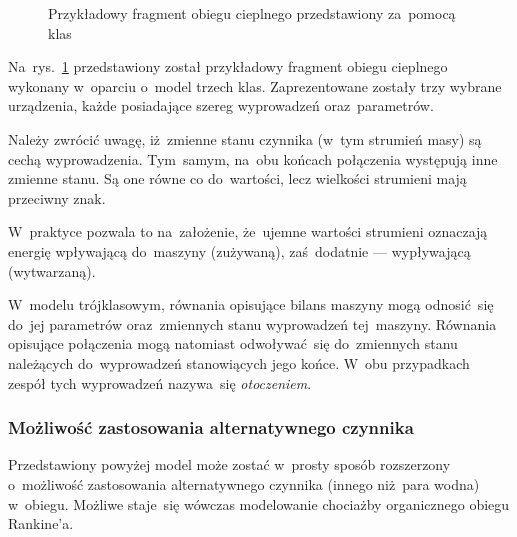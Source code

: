 \begin{figure}[h]

	\caption{Przykładowy fragment obiegu cieplnego przedstawiony
		za~pomocą klas}
	\label{klasy-przykl}
\end{figure}

Na~rys.~\ref{klasy-przykl} przedstawiony został przykładowy fragment
obiegu cieplnego wykonany w~oparciu o~model trzech klas. Zaprezentowane
zostały trzy wybrane urządzenia, każde posiadające szereg wyprowadzeń
oraz~parametrów.

Należy zwrócić uwagę, iż~zmienne stanu czynnika (w~tym strumień masy) są
cechą wyprowadzenia. Tym~samym, na~obu końcach połączenia występują inne
zmienne stanu. Są one równe co do~wartości, lecz wielkości strumieni
mają przeciwny znak.

W~praktyce pozwala to na~założenie, że~ujemne wartości strumieni
oznaczają energię wpływającą do~maszyny (zużywaną), zaś~dodatnie ---
wypływającą (wytwarzaną).

W~modelu trójklasowym, równania opisujące bilans maszyny mogą
odnosić~się do~jej parametrów oraz~zmiennych stanu wyprowadzeń
tej~maszyny. Równania opisujące połączenia mogą natomiast odwoływać~się
do~zmiennych stanu należących do~wyprowadzeń stanowiących jego końce.
W~obu przypadkach zespół tych wyprowadzeń nazywa~się
\textit{otoczeniem}.


\subsubsection{Możliwość zastosowania alternatywnego czynnika}

Przedstawiony powyżej model może zostać w~prosty sposób rozszerzony
o~możliwość zastosowania alternatywnego czynnika (innego niż~para wodna)
w~obiegu. Możliwe staje~się wówczas modelowanie chociażby organicznego
obiegu Rankine'a.

